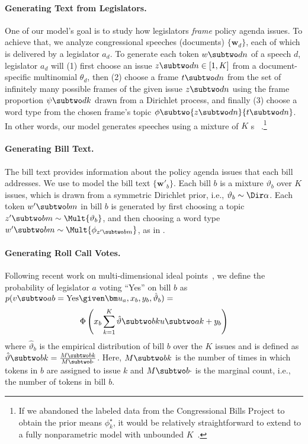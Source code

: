 \paragraph{Generating Text from Legislators.}
One of our model's goal is to study how legislators \textit{frame} policy agenda issues. To achieve that, we analyze congressional speeches (documents) $\{\bm w_d\}$, each of which is delivered by a legislator $a_d$. To generate each token $w \subtwo dn$ of a speech $d$, legislator $a_d$ will (1) first choose an issue $z \subtwo dn \in [1,K]$ from a document-specific multinomial $\theta_d$, then (2) choose a frame $t \subtwo dn$ from the set of infinitely many possible frames of the given issue $z \subtwo dn$ using the frame proportion $\psi \subtwo dk$ drawn from a Dirichlet process, and finally (3) choose a word type from the chosen frame's topic $\phi \subtwo {z \subtwo dn}{t \subtwo dn}$. In other words, our model generates speeches using a mixture of $K$ \hdp{}s ~\cite{Teh:JASA06:hdp}.\footnote{If we abandoned the labeled data from the Congressional Bills Project to obtain the prior means $\phi_k^{\star}$, it would be relatively straightforward to extend to a fully nonparametric model with unbounded $K$~\cite{Ahmed:ICML13:ncrf,Paisley:TPAMI14:nhdp}.}




\paragraph{Generating Bill Text.}
\label{subsec:c6_bill_text}
The bill text provides information about the policy agenda issues that each bill
addresses. We use \lda{} to model the bill text $\{\bm w'_b\}$. Each bill $b$ is
a mixture $\vartheta_b$ over $K$ issues, which is drawn from a symmetric
Dirichlet prior, i.e., $\vartheta_b \sim \Dir \alpha$. Each token $w' \subtwo
bm$ in bill $b$ is generated by first choosing a topic $z' \subtwo bm \sim \Mult
{\vartheta_b}$, and then choosing a word type $w' \subtwo bm \sim \Mult
{\phi_{z' \subtwo bm}}$, as in \lda{}.

\paragraph{Generating Roll Call Votes.}
\label{subsec:c6_vote}
Following recent work on multi-dimensional ideal
points~\cite{Lauderdale:AJPS14,Sim:AAAI15:utility}, we define the probability of
legislator $a$ voting ``Yes'' on bill $b$ as $p(v \subtwo ab = \mbox{Yes} \given
\bm u_a, x_b, y_b,\hat{\vartheta}_b) =$
\begin{equation}
\Phi\left(x_b \sum_{k=1}^K \hat{\vartheta} \subtwo bk u \subtwo ak + y_b\right)
\end{equation}
where $\hat{\vartheta}_b$ is the empirical distribution of bill $b$ over the $K$ issues and is
defined as $\hat{\vartheta} \subtwo bk = \frac{M \subtwo bk}{M \subtwo b{\cdot}}$. Here, $M \subtwo
bk$ is the number of times in which tokens in $b$ are assigned to issue $k$ and $M \subtwo
b{\cdot}$ is the marginal count, i.e., the number of tokens in bill $b$.

